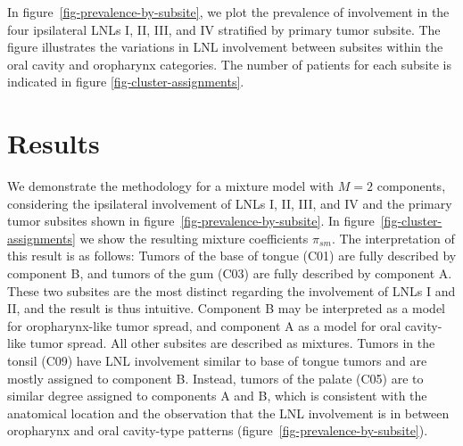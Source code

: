 \documentclass[11pt,twocolumn,twoside]{article}
\begin{document}
In figure~\ref{fig-prevalence-by-subsite}, we plot the
prevalence of involvement in the four ipsilateral LNLs I, II, III, and
IV stratified by primary tumor subsite. 
The figure illustrates the variations in LNL involvement between subsites within
the oral cavity and oropharynx categories. The number of patients for each subsite is indicated in figure \ref{fig-cluster-assignments}. 

\section{Results}\label{sec-results}

We demonstrate the methodology for a mixture model with \(M=2\)
components, considering the ipsilateral involvement of LNLs I, II, III,
and IV and the primary tumor subsites shown in
figure~\ref{fig-prevalence-by-subsite}. In
figure~\ref{fig-cluster-assignments} we show the resulting mixture
coefficients \(\pi_{sm}\). The interpretation of this result is as
follows: Tumors of the base of tongue (C01) are fully described by
component B, and tumors of the gum (C03) are fully described by
component A. These two subsites are the most distinct regarding the
involvement of LNLs I and II, and the result is thus intuitive.
Component B may be interpreted as a model for oropharynx-like tumor
spread, and component A as a model for oral cavity-like tumor spread.
All other subsites are described as mixtures. Tumors in the tonsil (C09)
have LNL involvement similar to base of tongue tumors and are mostly
assigned to component B. Instead, tumors of the palate (C05) are to
similar degree assigned to components A and B, which is consistent with
the anatomical location and the observation that the LNL involvement is
in between oropharynx and oral cavity-type patterns (figure~\ref{fig-prevalence-by-subsite}).
\end{document}
